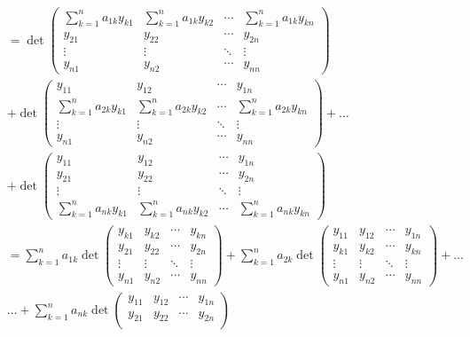 \documentclass[11pt,a4paper,twoside]{book}
\begin{document}
\begin{align*}
&= \det
\begin{pmatrix}
\sum_{k=1}^{n} a_{1k} y_{k1} & \sum_{k=1}^{n} a_{1k} y_{k2} & \cdots & \sum_{k=1}^{n} a_{1k} y_{kn} \\
y_{21} & y_{22} & \cdots & y_{2n} \\
\vdots & \vdots & \ddots & \vdots \\
y_{n1} & y_{n2} & \cdots & y_{nn}
\end{pmatrix} \\
&+ \det
\begin{pmatrix}
y_{11} & y_{12} & \cdots & y_{1n} \\
\sum_{k=1}^{n} a_{2k} y_{k1} & \sum_{k=1}^{n} a_{2k} y_{k2} & \cdots & \sum_{k=1}^{n} a_{2k} y_{kn} \\
\vdots & \vdots & \ddots & \vdots \\
y_{n1} & y_{n2} & \cdots & y_{nn}
\end{pmatrix}
+ \dots \\
&+ \det
\begin{pmatrix}
y_{11} & y_{12} & \cdots & y_{1n} \\
y_{21} & y_{22} & \cdots & y_{2n} \\
\vdots & \vdots & \ddots & \vdots \\
\sum_{k=1}^{n} a_{nk} y_{k1} & \sum_{k=1}^{n} a_{nk} y_{k2} & \cdots & \sum_{k=1}^{n} a_{nk} y_{kn}
\end{pmatrix} \\
&= \sum_{k=1}^{n} a_{1k} \det
\begin{pmatrix}
y_{k1} & y_{k2} & \cdots & y_{kn} \\
y_{21} & y_{22} & \cdots & y_{2n} \\
\vdots & \vdots & \ddots & \vdots \\
y_{n1} & y_{n2} & \cdots & y_{nn}
\end{pmatrix}
+ \sum_{k=1}^{n} a_{2k} \det
\begin{pmatrix}
y_{11} & y_{12} & \cdots & y_{1n} \\
y_{k1} & y_{k2} & \cdots & y_{kn} \\
\vdots & \vdots & \ddots & \vdots \\
y_{n1} & y_{n2} & \cdots & y_{nn}
\end{pmatrix}
+ \dots \\
&\dots + \sum_{k=1}^{n} a_{nk} \det
\begin{pmatrix}
y_{11} & y_{12} & \cdots & y_{1n} \\
y_{21} & y_{22} & \cdots & y_{2n} \\

\end{pmatrix}
\end{align*}
\end{document}

